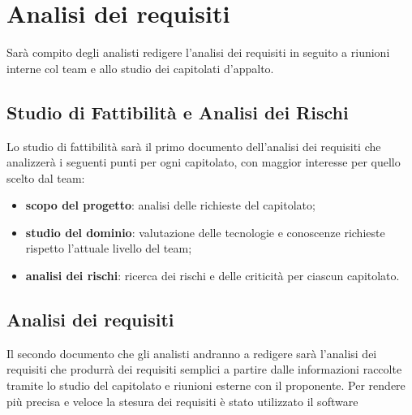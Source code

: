 \section{Analisi dei requisiti}
Sarà compito degli analisti redigere l'analisi dei requisiti in seguito a riunioni interne col team e allo studio dei capitolati d'appalto.
	\subsection{Studio di Fattibilità e Analisi dei Rischi}
	Lo studio di fattibilità sarà il primo documento dell'analisi dei requisiti che analizzerà i seguenti punti per ogni capitolato, con maggior interesse per quello scelto dal team:
	\begin{itemize}
		\item \textbf{scopo del progetto}: analisi delle richieste del capitolato;
		\item \textbf{studio del dominio}: valutazione delle tecnologie e conoscenze richieste rispetto l'attuale livello del team;
		\item \textbf{analisi dei rischi}: ricerca dei rischi e delle criticità per ciascun capitolato.
	\end{itemize}
	\subsection{Analisi dei requisiti}
	Il secondo documento che gli analisti andranno a redigere sarà l'analisi dei requisiti che produrrà dei requisiti semplici a partire dalle informazioni raccolte tramite lo studio del capitolato e riunioni esterne con il proponente.
	Per rendere più precisa e veloce la stesura dei requisiti è stato utilizzato il software 
